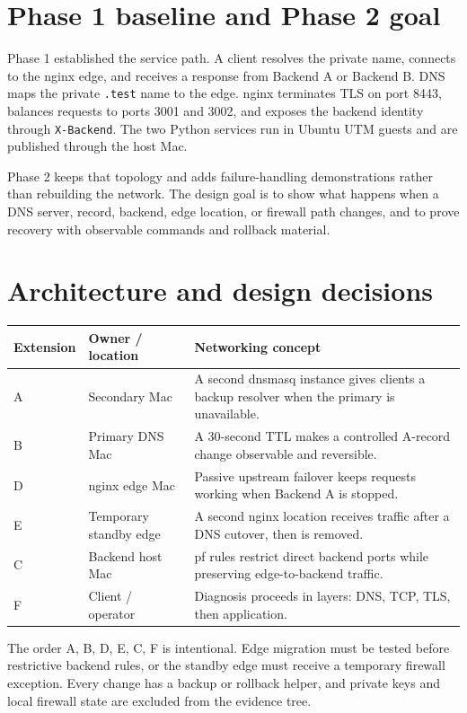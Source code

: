\documentclass[11pt,a4paper]{article}
\begin{document}
\section{Phase 1 baseline and Phase 2 goal}
Phase 1 established the service path. A client resolves the private name, connects
to the nginx edge, and receives a response from Backend A or Backend B. DNS maps the
private \texttt{.test} name to the edge. nginx terminates TLS on port 8443, balances
requests to ports 3001 and 3002, and exposes the backend identity through
\texttt{X-Backend}. The two Python services run in Ubuntu UTM guests and are published
through the host Mac.

Phase 2 keeps that topology and adds failure-handling demonstrations rather than
rebuilding the network. The design goal is to show what happens when a DNS server,
record, backend, edge location, or firewall path changes, and to prove recovery with
observable commands and rollback material.

\section{Architecture and design decisions}
\begin{longtable}{@{}p{2.5cm}p{4.1cm}p{7.0cm}@{}}
\toprule
\textbf{Extension} & \textbf{Owner / location} & \textbf{Networking concept}\\
\midrule
A & Secondary Mac & A second dnsmasq instance gives clients a backup resolver when the primary is unavailable.\\
B & Primary DNS Mac & A 30-second TTL makes a controlled A-record change observable and reversible.\\
D & nginx edge Mac & Passive upstream failover keeps requests working when Backend A is stopped.\\
E & Temporary standby edge & A second nginx location receives traffic after a DNS cutover, then is removed.\\
C & Backend host Mac & pf rules restrict direct backend ports while preserving edge-to-backend traffic.\\
F & Client / operator & Diagnosis proceeds in layers: DNS, TCP, TLS, then application.\\
\bottomrule
\end{longtable}

The order A, B, D, E, C, F is intentional. Edge migration must be tested before
restrictive backend rules, or the standby edge must receive a temporary firewall
exception. Every change has a backup or rollback helper, and private keys and local
firewall state are excluded from the evidence tree.
\end{document}
